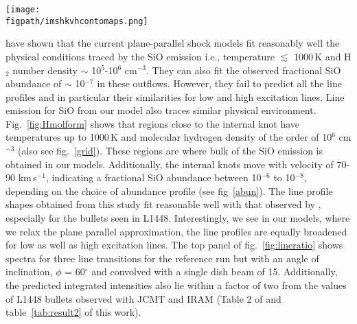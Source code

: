 \documentclass[useAMS,usenatbib]{mn2e}
\newcommand{\figpath}{PFIGS/}
\begin{document}
\begin{figure*}
 \texttt{[image: \\figpath/imshkvhcontomaps.png]}
 \caption{Symmetrical contour maps of multi-line integrated SiO
   emission convolved with a 2\arcsec beam obtained using parameters of the reference run. The contour colors represent different intenties in Kelvins, i.e,
   30.0({\it red}), 10.0({\it green}), 5.0({\it blue}), 1.0({\it
     magenta}), 0.5({\it cyan}), 0.1({\it black}).} 
\label{fig:ltconts}
\end{figure*}

\cite{Nisini:2007p13128} have shown that the current
plane-parallel shock models fit reasonably well the physical
conditions traced by the SiO emission i.e., temperature $\lesssim$
1000\,K and H$_{2}$ number density $\sim$ 10$^{5}$-10$^{6}$
cm$^{-3}$. They can also fit the observed fractional SiO abundance of
$\sim$ 10$^{-7}$ in these outflows. However, they fail to predict all
the line profiles and in particular their similarities for low and
high excitation lines. Line emission for SiO from our model also traces similar
physical environment. Fig.~\ref{fig:Hmolform} shows that regions close
to the internal knot have temperatures up to 1000\,K and molecular
hydrogen density of the order of 10$^{6}$ cm$^{-3}$ (also see fig.~\ref{grid}).
These regions are where bulk of the
SiO emission is obtained in our models. Additionally, the internal
knots move with velocity of 70-90 km\,s$^{-1}$, indicating a
fractional SiO abundance between 10$^{-6}$ to 10$^{-8}$, depending on the
choice of abundance profile (see fig~\ref{abun}). 
The line profile shapes obtained from this study fit reasonable well with that observed by
\cite{Nisini:2007p13128}, especially for the bullets seen in
L1448. Interestingly, we see in our models, where we relax the plane parallel
approximation, the line profiles are equally broadened for low as well
as high excitation lines. The top panel of fig.~\ref{fig:lineratio} shows spectra for three line
transitions for the reference run but with an angle of inclination,
$\phi$ = 60$^{\circ}$ and convolved with a single dish beam of
15\arcsec. Additionally, the predicted integrated
intensities also lie within a factor of two from the values of L1448 bullets
observed with JCMT and IRAM (Table 2 of \citealt{Nisini:2007p13128}  and
table~\ref{tab:result2} of this work).
%
\end{document}
